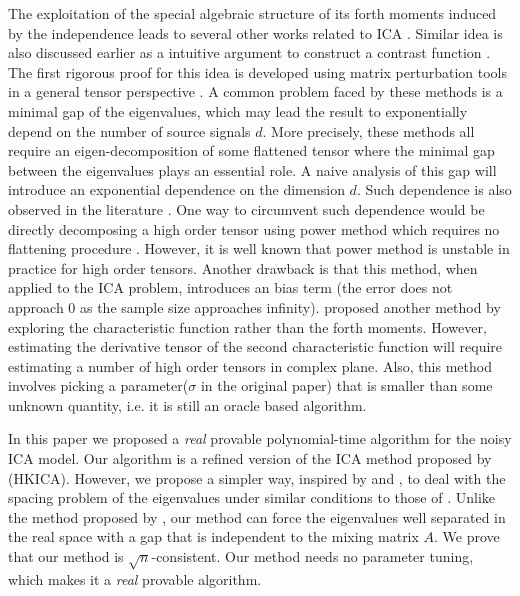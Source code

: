 \documentclass[twoside]{article}
\theoremstyle{definition}
\begin{document}
The exploitation of the special algebraic structure of its forth moments induced by the independence leads to several other works related to ICA \citep{hsu2013learning,anandkumar2012tensordecomposition,anandkumar2012method}. 
Similar idea is also discussed earlier as a intuitive argument to construct a contrast function \citep{cardoso1999high}. 
The first rigorous proof for this idea is developed using matrix perturbation tools in a general tensor perspective \citep{anandkumar2012tensordecomposition,anandkumar2012method,goyal2014fourier}. 
A common problem faced by these methods is a minimal gap of the eigenvalues, which may lead the result to exponentially depend on the number of source signals $d$.
More precisely, these methods all require an eigen-decomposition of some flattened tensor where the minimal gap between the eigenvalues plays an essential role. 
A naive analysis of this gap will introduce an exponential dependence on the dimension $d$. 
Such dependence is also observed in the literature \citep{cardoso1999high,goyal2014fourier}.
One way to circumvent such dependence would be directly decomposing a high order tensor using power method which requires no flattening procedure \citep{anandkumar2014guaranteed}. 
However, it is well known that power method is unstable in practice for high order tensors. 
Another drawback is that this method, when applied to the ICA problem, introduces an bias term (the error does not approach 0 as the sample size approaches infinity). 
\citet{goyal2014fourier} proposed another method by exploring the characteristic function rather than the forth moments. 
However, estimating the derivative tensor of the second characteristic function will require estimating a number of high order tensors in complex plane. 
Also, this method involves picking a parameter($\sigma$ in the original paper) that is smaller than some unknown quantity, i.e. it is still an oracle based  algorithm.

In this paper we proposed a \emph{real} provable polynomial-time algorithm for the noisy ICA model.
Our algorithm is a refined version of the ICA method proposed by \cite{hsu2013learning} (HKICA). 
However, we propose a simpler way, inspired by \citet{frieze1996learning} and \citet{arora2012provable}, to deal with the spacing problem of the eigenvalues under similar conditions to those of \citet{goyal2014fourier}.
Unlike the method proposed by \citet{goyal2014fourier}, our method can force the eigenvalues well separated in the real space with a gap that is independent to the mixing matrix $A$.
We prove that our method is $\sqrt{n}$-consistent.
Our method needs no parameter tuning, which makes it a \emph{real} provable algorithm.  
\end{document}
